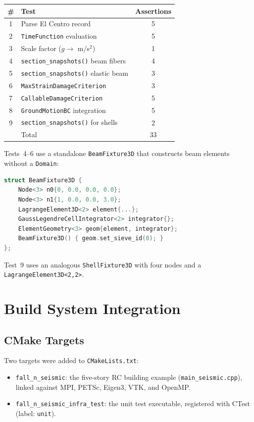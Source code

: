 \begin{center}
\begin{tabular}{clc}
  \toprule
  \# & Test & Assertions \\
  \midrule
  1 & Parse El Centro record & 5 \\
  2 & \texttt{TimeFunction} evaluation & 5 \\
  3 & Scale factor ($g \to$ m/s$^2$) & 1 \\
  4 & \texttt{section\_snapshots()} beam fibers & 4 \\
  5 & \texttt{section\_snapshots()} elastic beam & 3 \\
  6 & \texttt{MaxStrainDamageCriterion} & 3 \\
  7 & \texttt{CallableDamageCriterion} & 5 \\
  8 & \texttt{GroundMotionBC} integration & 5 \\
  9 & \texttt{section\_snapshots()} for shells & 2 \\
  \midrule
  & Total & 33 \\
  \bottomrule
\end{tabular}
\end{center}

Tests~4--6 use a standalone \texttt{BeamFixture3D} that
constructs beam elements without a \texttt{Domain}:
%
\begin{lstlisting}[language=C++,basicstyle=\ttfamily\small]
struct BeamFixture3D {
    Node<3> n0{0, 0.0, 0.0, 0.0};
    Node<3> n1{1, 0.0, 0.0, 3.0};
    LagrangeElement3D<2> element{...};
    GaussLegendreCellIntegrator<2> integrator{};
    ElementGeometry<3> geom{element, integrator};
    BeamFixture3D() { geom.set_sieve_id(0); }
};
\end{lstlisting}
%
Test~9 uses an analogous \texttt{ShellFixture3D} with
four nodes and a \texttt{LagrangeElement3D<2,2>}.


\section{Build System Integration}
\label{sec:seismic-build}

\subsection{CMake Targets}

Two targets were added to \texttt{CMakeLists.txt}:
%
\begin{itemize}
  \item \texttt{fall\_n\_seismic}: the five-story RC building
        example (\texttt{main\_seismic.cpp}), linked against
        MPI, PETSc, Eigen3, VTK, and OpenMP.
  \item \texttt{fall\_n\_seismic\_infra\_test}: the unit test
        executable, registered with CTest (label: \texttt{unit}).
\end{itemize}

